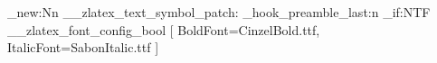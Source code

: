 



\cs_new:Nn \__zlatex_text_symbol_patch: 
  {
    \let\oldtextbullet\textbullet
    \DeclareTextFontCommand{\zslideCmsyOms}
      {\selectfont}
    \DeclareRobustCommand{\textbullet}
      {\zslideCmsyOms\oldtextbullet}
  }
\zlatex_hook_preamble_last:n {
  \bool_if:NTF \g__zlatex_font_config_bool {
    \RequirePackage{fontspec}
    [
      BoldFont=CinzelBold.ttf,
      ItalicFont=SabonItalic.ttf
    ]
  }{\def\Cinzel{\relax}}
}
